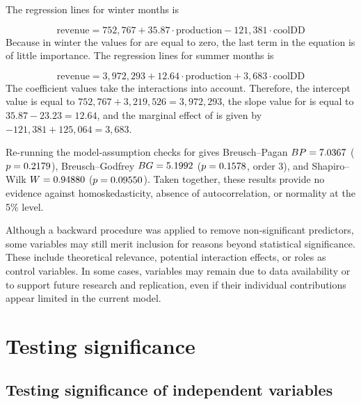The regression lines for winter months is

\begin{equation*}
  \text{revenue} = 752,767 + 35.87 \cdot \text{production} - 121,381 \cdot \text{coolDD} 
\end{equation*}
Because in winter the values for  are equal to zero, the last term in the equation is of little importance.
The regression lines for summer months is

\begin{equation*}
  \text{revenue} = 3,972,293 + 12.64 \cdot \text{production} + 3,683 \cdot \text{coolDD}
\end{equation*}
The coefficient values take the interactions into account. Therefore, the intercept value is equal to $752,767 + 3,219,526 = 3,972,293$, the slope value for  is equal to $35.87 - 23.23 = 12.64$, and the marginal effect of  is given by $-121,381 + 125,064 = 3,683$.

Re-running the model-assumption checks for  gives Breusch--Pagan $BP = \RegModFiveBp$ ($p = \RegModFiveBpP$), Breusch--Godfrey $BG = \RegModFiveBg$ ($p = \RegModFiveBgP$, order 3), and Shapiro--Wilk $W = \RegModFiveW$ ($p = \RegModFiveShapiroP$). Taken together, these results provide no evidence against homoskedasticity, absence of autocorrelation, or normality at the 5\% level.

Although a backward procedure was applied to remove non-significant predictors, some variables may still merit inclusion for reasons beyond statistical significance. 
These include theoretical relevance, potential interaction effects, or roles as control variables. 
In some cases, variables may remain due to data availability or to support future research and replication, even if their individual contributions appear limited in the current model.


\section{Testing significance} %
\label{sec:testing_significance}

\subsection{Testing significance of independent variables} %
\label{sub:testing_significance_of_independent_variables}


